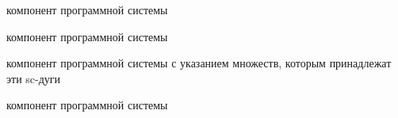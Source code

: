 \begin{SCn}
\begin{scnrelfromlist}{компонент программной системы}
\begin{scnindent}
\begin{scnrelfromlist}{компонент программной системы}
\begin{scnindent}
\begin{scnrelfromlist}{компонент программной системы}
{                    с указанием множеств, которым принадлежат эти sc-дуги}
                \end{scnrelfromlist}
            \end{scnindent}
        \end{scnrelfromlist}
    \end{scnindent}
    \begin{scnindent}
        \begin{scnrelfromlist}{компонент программной системы}
        \end{scnrelfromlist}
    \end{scnindent}
\end{scnrelfromlist}
\end{SCn}

